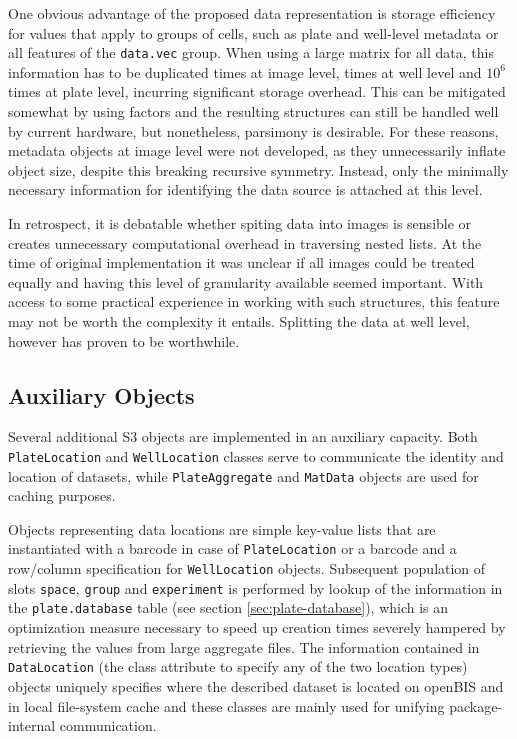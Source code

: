 One obvious advantage of the proposed data representation is storage efficiency for values that apply to groups of cells, such as plate and well-level metadata or all features of the \texttt{data.vec} group. When using a large matrix for all data, this information has to be duplicated  times at image level,  times at well level and \tilde $10^6$ times at plate level, incurring significant storage overhead. This can be mitigated somewhat by using factors and the resulting structures can still be handled well by current hardware, but nonetheless, parsimony is desirable. For these reasons, metadata objects at image level were not developed, as they unnecessarily inflate object size, despite this breaking recursive symmetry. Instead, only the minimally necessary information for identifying the data source is attached at this level.

In retrospect, it is debatable whether spiting data into images is sensible or creates unnecessary computational overhead in traversing nested lists. At the time of original implementation it was unclear if all images could be treated equally and having this level of granularity available seemed important. With access to some practical experience in working with such structures, this feature may not be worth the complexity it entails. Splitting the data at well level, however has proven to be worthwhile.

\subsection{Auxiliary Objects}
\label{sec:auxiliary-objects}
Several additional S3 objects are implemented in an auxiliary capacity. Both \texttt{PlateLocation} and \texttt{WellLocation} classes serve to communicate the identity and location of datasets, while \texttt{PlateAggregate} and \texttt{MatData} objects are used for caching purposes.

Objects representing data locations are simple key-value lists that are instantiated with a barcode in case of \texttt{PlateLocation} or a barcode and a row\slash column specification for \texttt{WellLocation} objects. Subsequent population of slots \texttt{space}, \texttt{group} and \texttt{experiment} is performed by lookup of the information in the \texttt{plate.database} table (see section \ref{sec:plate-database}), which is an optimization measure necessary to speed up creation times severely hampered by retrieving the values from large aggregate files. The information contained in \texttt{DataLocation} (the class attribute to specify any of the two location types) objects uniquely specifies where the described dataset is located on openBIS and in local file-system cache and these classes are mainly used for unifying package-internal communication.

